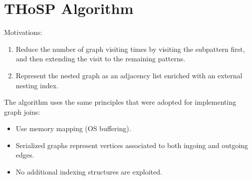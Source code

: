 
\section{THoSP Algorithm}
\begin{lucido}
Motivations:
\begin{enumerate}
	[circle]
	\item Reduce the number of graph visiting times by visiting the subpattern first, and then extending the visit to the remaining patterns.
	\item Represent the nested graph as an adjacency list enriched with an external nesting index.
\end{enumerate}
The algorithm uses the same principles that were adopted for implementing graph joins:
\begin{itemize}
	[square]
	\item Use memory mapping (OS buffering).
	\item Serialized graphs represent vertices  associated to both ingoing and outgoing edges.
	\item No additional indexing structures are exploited.
\end{itemize}
\end{lucido}

